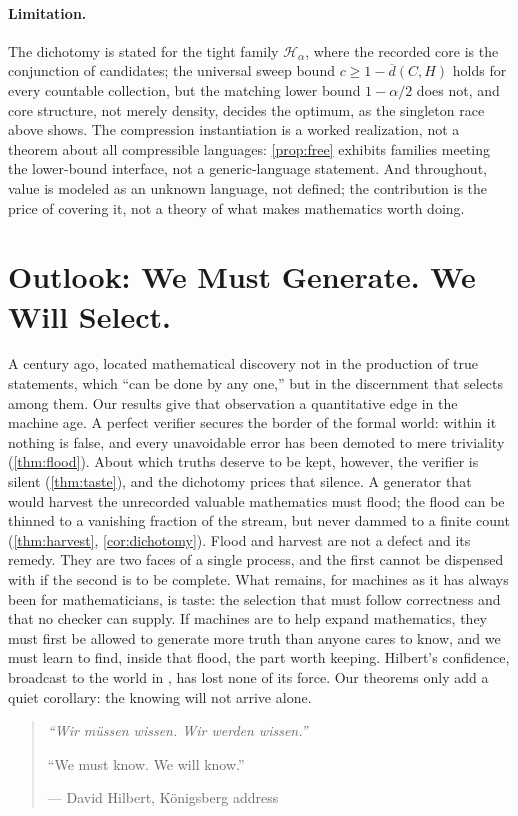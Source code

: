 \documentclass[11pt]{article}
\numberwithin{equation}{section}
\newcommand{\mc}[1]{\mathcal{#1}}
\newcommand{\Val}{H}
\newcommand{\Hcal}{\mc{H}}
\newcommand{\Hfam}{\Hcal_{\alpha}}
\newcommand{\Core}{C}
\newcommand{\dup}[2]{\overline{d}(#1,#2)}
\newcommand{\cov}{c}
\theoremstyle{plain}
\theoremstyle{definition}
\theoremstyle{remark}
\begin{document}
\paragraph{Limitation.}
The dichotomy is stated for the tight family $\Hfam$, where the recorded core is the
conjunction of candidates; the universal sweep bound $\cov\ge 1-\dup{\Core}{\Val}$ holds for
every countable collection, but the matching lower bound $1-\alpha/2$ does not, and core
structure, not merely density, decides the optimum, as the singleton race above shows. The
compression instantiation is a worked realization, not a theorem about all compressible
languages: \cref{prop:free} exhibits families meeting the lower-bound interface, not a
generic-language statement. And throughout, value is modeled as an unknown language, not
defined; the contribution is the price of covering it, not a theory of what makes mathematics
worth doing.

\section{Outlook: We Must Generate. We Will Select.}
\label{sec:coda}

A century ago, \citet{poincare1914science} located mathematical discovery not in the
production of true statements, which ``can be done by any one,'' but in the discernment that
selects among them. Our results give that observation a quantitative edge in the machine age.
A perfect verifier secures the border of the formal world: within it nothing is false, and
every unavoidable error has been demoted to mere triviality (\cref{thm:flood}). About which
truths deserve to be kept, however, the verifier is silent (\cref{thm:taste}), and the
dichotomy prices that silence. A generator that would harvest the unrecorded valuable
mathematics must flood; the flood can be thinned to a vanishing fraction of the stream, but
never dammed to a finite count (\cref{thm:harvest}, \cref{cor:dichotomy}). Flood and harvest
are not a defect and its remedy. They are two faces of a single process, and the first cannot
be dispensed with if the second is to be complete. What remains, for machines as it has
always been for mathematicians, is taste: the selection that must follow correctness and that
no checker can supply. If machines are to help expand mathematics, they must first be allowed
to generate more truth than anyone cares to know, and we must learn to find, inside that
flood, the part worth keeping. Hilbert's confidence, broadcast to the world in
\citeyear{hilbert1930naturerkennen}, has lost none of its force. Our theorems only add a
quiet corollary: the knowing will not arrive alone.
\begin{poincarebox}
\begin{quote}
\itshape
``Wir m\"ussen wissen. Wir werden wissen.''

``We must know. We will know.''

\hfill --- David Hilbert, K\"onigsberg address \citeyearpar{hilbert1930naturerkennen}
\end{quote}
\end{poincarebox}
\end{document}
